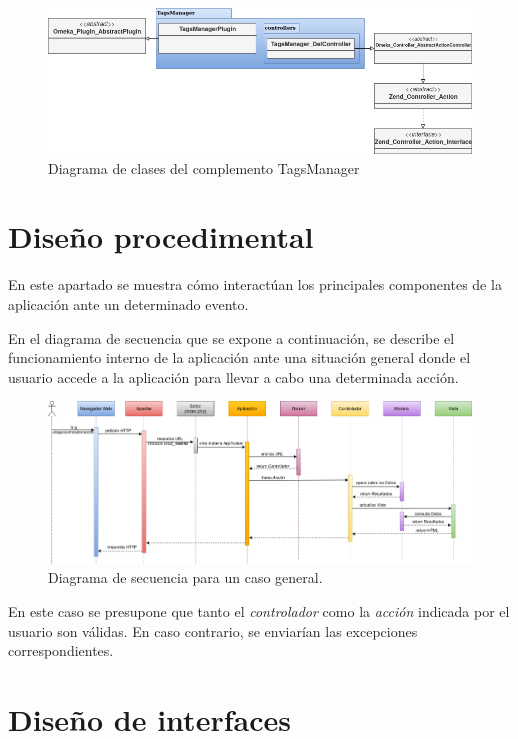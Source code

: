 \documentclass[
]{article}
\begin{document}
\begin{figure}
\hypertarget{da-pck-10}{%
\centering
\includegraphics{../_static/images/pck-10.png}
\caption{Diagrama de clases del complemento
TagsManager}\label{da-pck-10}
}
\end{figure}

\hypertarget{diseuxf1o-procedimental}{%
\section{Diseño procedimental}\label{diseuxf1o-procedimental}}

En este apartado se muestra cómo interactúan los principales componentes
de la aplicación ante un determinado evento.

En el diagrama de secuencia que se expone a continuación, se describe el
funcionamiento interno de la aplicación ante una situación general donde
el usuario accede a la aplicación para llevar a cabo una determinada
acción.

\begin{figure}
\hypertarget{dp-seq}{%
\centering
\includegraphics{../_static/images/dp-seq.png}
\caption{Diagrama de secuencia para un caso general.}\label{dp-seq}
}
\end{figure}

En este caso se presupone que tanto el \emph{controlador} como la
\emph{acción} indicada por el usuario son válidas. En caso contrario, se
enviarían las excepciones correspondientes.

\hypertarget{diseuxf1o-de-interfaces}{%
\section{Diseño de interfaces}\label{diseuxf1o-de-interfaces}}
\end{document}
